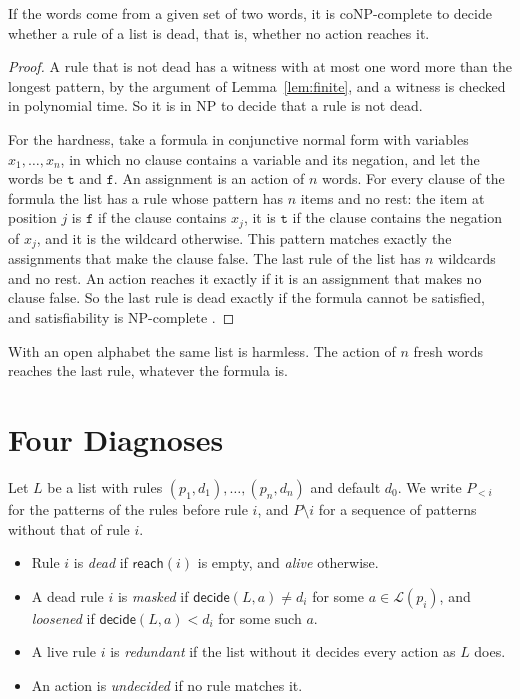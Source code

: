 \documentclass[acmsmall,nonacm,screen]{acmart}
\newcommand{\kw}[1]{\mathsf{#1}}
\newcommand{\lang}[1]{\mathcal{L}(#1)}
\newcommand{\reach}{\kw{reach}}
\newcommand{\dec}{\kw{decide}}
\begin{document}
\begin{theorem}\label{thm:closed}
If the words come from a given set of two words, it is coNP-complete to decide whether a rule
of a list is dead, that is, whether no action reaches it.
\end{theorem}

\begin{proof}
A rule that is not dead has a witness with at most one word more than the longest pattern, by
the argument of Lemma~\ref{lem:finite}, and a witness is checked in polynomial time. So it is
in NP to decide that a rule is not dead.

For the hardness, take a formula in conjunctive normal form with variables $x_1, \ldots,
x_n$, in which no clause contains a variable and its negation, and let the words be
$\texttt{t}$ and $\texttt{f}$. An assignment is an action of $n$ words. For every clause of
the formula the list has a rule whose pattern has $n$ items and no rest: the item at position
$j$ is $\texttt{f}$ if the clause contains $x_j$, it is $\texttt{t}$ if the clause contains
the negation of $x_j$, and it is the wildcard otherwise. This pattern matches exactly the
assignments that make the clause false. The last rule of the list has $n$ wildcards and no
rest. An action reaches it exactly if it is an assignment that makes no clause false. So the
last rule is dead exactly if the formula cannot be satisfied, and satisfiability is
NP-complete \citep{Cook1971}.
\end{proof}

With an open alphabet the same list is harmless. The action of $n$ fresh words reaches the
last rule, whatever the formula is.

\section{Four Diagnoses}\label{sec:diagnoses}

Let $L$ be a list with rules $(p_1, d_1), \ldots, (p_n, d_n)$ and default $d_0$. We write
$P_{<i}$ for the patterns of the rules before rule $i$, and $P \setminus i$ for a sequence of
patterns without that of rule $i$.

\begin{itemize}
\item Rule $i$ is \emph{dead} if $\reach(i)$ is empty, and \emph{alive} otherwise.
\item A dead rule $i$ is \emph{masked} if $\dec(L, a) \ne d_i$ for some $a \in \lang{p_i}$,
  and \emph{loosened} if $\dec(L, a) < d_i$ for some such $a$.
\item A live rule $i$ is \emph{redundant} if the list without it decides every action as $L$
  does.
\item An action is \emph{undecided} if no rule matches it.
\end{itemize}
\end{document}

